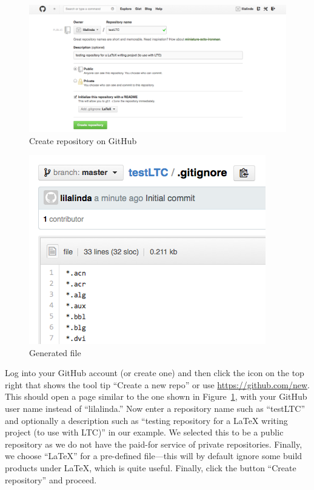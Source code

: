 \begin{figure}
\centering
\includegraphics[scale=\myscale]{figures/create-repo}
\caption{Create repository on GitHub} \label{fig:create-repo}
\end{figure}
\begin{figure}
\centering
\includegraphics[scale=\myscale]{figures/gitignore-contents}
\caption{Generated  file} \label{fig:gitignore}
\end{figure}
Log into your GitHub account (or create one) and then click the icon on the top right that shows the tool tip ``Create a new repo'' or use \url{https://github.com/new}.  This should open a page similar to the one shown in Figure~\ref{fig:create-repo}, with your GitHub user name instead of ``lilalinda.''  Now enter a repository name such as ``testLTC'' and optionally a description such as ``testing repository for a LaTeX writing project (to use with LTC)'' in our example.  We selected this to be a public repository as we do not have the paid-for service of private repositories.  Finally, we choose ``LaTeX'' for a pre-defined  file---this will by default ignore some build products under LaTeX, which is quite useful.  Finally, click the button ``Create repository'' and proceed.

